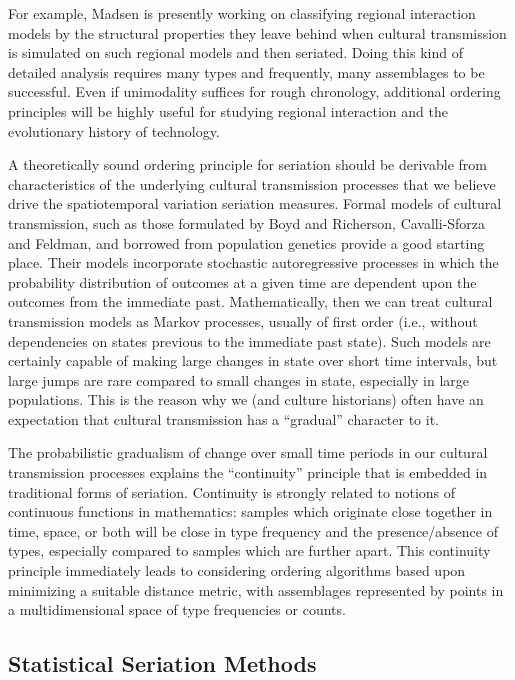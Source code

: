 \documentclass[graybox,natbib]{svmult}
\begin{document}
For example, Madsen \citeyearpar{madsenlipo2015b} is presently working
on classifying regional interaction models by the structural properties
they leave behind when cultural transmission is simulated on such
regional models and then seriated. Doing this kind of detailed analysis
requires many types and frequently, many assemblages to be successful.
Even if unimodality suffices for rough chronology, additional ordering
principles will be highly useful for studying regional interaction and
the evolutionary history of technology.

A theoretically sound ordering principle for seriation should be
derivable from characteristics of the underlying cultural transmission
processes that we believe drive the spatiotemporal variation seriation
measures. Formal models of cultural transmission, such as those
formulated by Boyd and Richerson, Cavalli-Sforza and Feldman, and
borrowed from population genetics
\citep{Boyd1985, Cavalli-Sforza1981, Neiman1995} provide a good starting
place. Their models incorporate stochastic autoregressive processes in
which the probability distribution of outcomes at a given time are
dependent upon the outcomes from the immediate past. Mathematically,
then we can treat cultural transmission models as Markov processes,
usually of first order (i.e., without dependencies on states previous to
the immediate past state). Such models are certainly capable of making
large changes in state over short time intervals, but large jumps are
rare compared to small changes in state, especially in large
populations. This is the reason why we (and culture historians) often
have an expectation that cultural transmission has a ``gradual''
character to it.

The probabilistic gradualism of change over small time periods in our
cultural transmission processes explains the ``continuity'' principle
that is embedded in traditional forms of seriation. Continuity is
strongly related to notions of continuous functions in mathematics:
samples which originate close together in time, space, or both will be
close in type frequency and the presence/absence of types, especially
compared to samples which are further apart. This continuity principle
immediately leads to considering ordering algorithms based upon
minimizing a suitable distance metric, with assemblages represented by
points in a multidimensional space of type frequencies or counts.

\subsection{Statistical Seriation
Methods}\label{statistical-seriation-methods}
\end{document}
